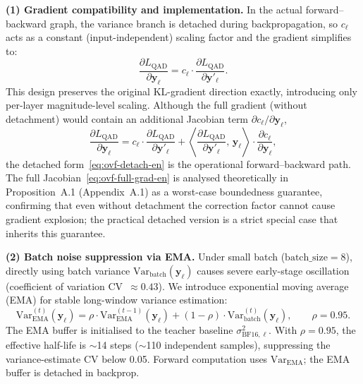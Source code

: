 \documentclass[11pt, a4paper]{article}
\begin{document}
\textbf{(1) Gradient compatibility and implementation.} In the actual forward--backward graph, the variance branch is detached during backpropagation, so $c_\ell$ acts as a constant (input-independent) scaling factor and the gradient simplifies to:
\begin{equation}
\frac{\partial L_{\mathrm{QAD}}}{\partial\bm{y}_\ell} = c_\ell\cdot\frac{\partial L_{\mathrm{QAD}}}{\partial\bm{y}'_\ell}.
\label{eq:ovf-detach-en}
\end{equation}
This design preserves the original KL-gradient direction exactly, introducing only per-layer magnitude-level scaling. Although the full gradient (without detachment) would contain an additional Jacobian term $\partial c_\ell/\partial\bm{y}_\ell$,
\begin{equation}
\frac{\partial L_{\mathrm{QAD}}}{\partial\bm{y}_\ell} = c_\ell\cdot\frac{\partial L_{\mathrm{QAD}}}{\partial\bm{y}'_\ell} + \left\langle\frac{\partial L_{\mathrm{QAD}}}{\partial\bm{y}'_\ell},\,\bm{y}_\ell\right\rangle\cdot\frac{\partial c_\ell}{\partial\bm{y}_\ell},
\label{eq:ovf-full-grad-en}
\end{equation}
the detached form~\eqref{eq:ovf-detach-en} is the operational forward--backward path. The full Jacobian~\eqref{eq:ovf-full-grad-en} is analysed theoretically in Proposition~A.1 (Appendix~A.1) as a worst-case boundedness guarantee, confirming that even without detachment the correction factor cannot cause gradient explosion; the practical detached version is a strict special case that inherits this guarantee.

\textbf{(2) Batch noise suppression via EMA.} Under small batch ($\text{batch\_size}=8$), directly using batch variance $\mathrm{Var}_{\mathrm{batch}}(\bm{y}_\ell)$ causes severe early-stage oscillation (coefficient of variation CV~$\approx 0.43$). We introduce exponential moving average (EMA) for stable long-window variance estimation:
\begin{equation}
\mathrm{Var}^{(t)}_{\mathrm{EMA}}(\bm{y}_\ell) = \rho\cdot\mathrm{Var}^{(t-1)}_{\mathrm{EMA}}(\bm{y}_\ell) + (1-\rho)\cdot\mathrm{Var}^{(t)}_{\mathrm{batch}}(\bm{y}_\ell), \qquad \rho = 0.95.
\end{equation}
The EMA buffer is initialised to the teacher baseline $\sigma^2_{\mathrm{BF16},\ell}$. With $\rho = 0.95$, the effective half-life is $\sim$14 steps ($\sim$110 independent samples), suppressing the variance-estimate CV below 0.05. Forward computation uses $\mathrm{Var}_{\mathrm{EMA}}$; the EMA buffer is detached in backprop.
\end{document}
